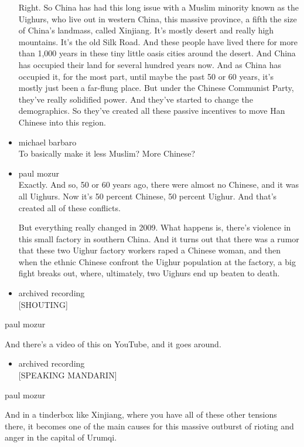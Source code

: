 \begin{itemize}
  Right. So China has had this long issue with a Muslim minority known
  as the Uighurs, who live out in western China, this massive province,
  a fifth the size of China's landmass, called Xinjiang. It's mostly
  desert and really high mountains. It's the old Silk Road. And these
  people have lived there for more than 1,000 years in these tiny little
  oasis cities around the desert. And China has occupied their land for
  several hundred years now. And as China has occupied it, for the most
  part, until maybe the past 50 or 60 years, it's mostly just been a
  far-flung place. But under the Chinese Communist Party, they've really
  solidified power. And they've started to change the demographics. So
  they've created all these passive incentives to move Han Chinese into
  this region.
\item
  michael barbaro\\
  To basically make it less Muslim? More Chinese?
\item
  paul mozur\\
  Exactly. And so, 50 or 60 years ago, there were almost no Chinese, and
  it was all Uighurs. Now it's 50 percent Chinese, 50 percent Uighur.
  And that's created all of these conflicts.

  But everything really changed in 2009. What happens is, there's
  violence in this small factory in southern China. And it turns out
  that there was a rumor that these two Uighur factory workers raped a
  Chinese woman, and then when the ethnic Chinese confront the Uighur
  population at the factory, a big fight breaks out, where, ultimately,
  two Uighurs end up beaten to death.
\item
  archived recording\\
  {[}SHOUTING{]}
\end{itemize}

paul mozur

And there's a video of this on YouTube, and it goes around.

\begin{itemize}
\tightlist
\item
  archived recording\\
  {[}SPEAKING MANDARIN{]}
\end{itemize}

paul mozur

And in a tinderbox like Xinjiang, where you have all of these other
tensions there, it becomes one of the main causes for this massive
outburst of rioting and anger in the capital of Urumqi.

